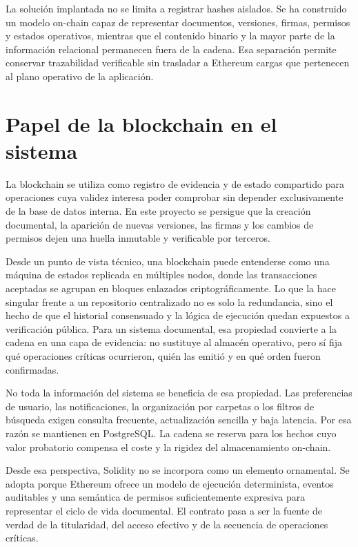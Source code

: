 \documentclass[11pt, a4paper]{article}
\begin{document}
La solución implantada no se limita a registrar hashes aislados. Se ha construido un modelo on-chain capaz de representar documentos, versiones, firmas, permisos y estados operativos, mientras que el contenido binario y la mayor parte de la información relacional permanecen fuera de la cadena. Esa separación permite conservar trazabilidad verificable sin trasladar a Ethereum cargas que pertenecen al plano operativo de la aplicación.

\section{Papel de la blockchain en el sistema}

La blockchain se utiliza como registro de evidencia y de estado compartido para operaciones cuya validez interesa poder comprobar sin depender exclusivamente de la base de datos interna. En este proyecto se persigue que la creación documental, la aparición de nuevas versiones, las firmas y los cambios de permisos dejen una huella inmutable y verificable por terceros.

Desde un punto de vista técnico, una blockchain puede entenderse como una máquina de estados replicada en múltiples nodos, donde las transacciones aceptadas se agrupan en bloques enlazados criptográficamente. Lo que la hace singular frente a un repositorio centralizado no es solo la redundancia, sino el hecho de que el historial consensuado y la lógica de ejecución quedan expuestos a verificación pública. Para un sistema documental, esa propiedad convierte a la cadena en una capa de evidencia: no sustituye al almacén operativo, pero sí fija qué operaciones críticas ocurrieron, quién las emitió y en qué orden fueron confirmadas.

No toda la información del sistema se beneficia de esa propiedad. Las preferencias de usuario, las notificaciones, la organización por carpetas o los filtros de búsqueda exigen consulta frecuente, actualización sencilla y baja latencia. Por esa razón se mantienen en PostgreSQL. La cadena se reserva para los hechos cuyo valor probatorio compensa el coste y la rigidez del almacenamiento on-chain.

Desde esa perspectiva, Solidity no se incorpora como un elemento ornamental. Se adopta porque Ethereum ofrece un modelo de ejecución determinista, eventos auditables y una semántica de permisos suficientemente expresiva para representar el ciclo de vida documental. El contrato pasa a ser la fuente de verdad de la titularidad, del acceso efectivo y de la secuencia de operaciones críticas.
\end{document}

